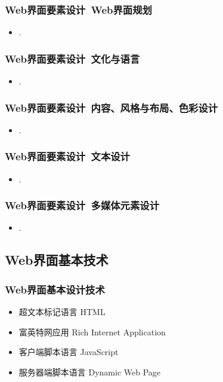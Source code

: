 \documentclass{beamer}
\newcommand{\fullPageImage}[2]{
	{
		\usebackgroundtemplate{\texttt{[image: \#1]}}
		\frame[plain]{#2}
	}
}
\begin{document}
\begin{frame}
	\frametitle{Web界面要素设计~{\small Web界面规划}}
	\beamertemplatetransparentcovereddynamicmedium
	\begin{itemize}[<+->]
		\item .
	\end{itemize}
\end{frame}

\begin{frame}
	\frametitle{Web界面要素设计~{\small 文化与语言}}
	\beamertemplatetransparentcovereddynamicmedium
	\begin{itemize}[<+->]
		\item .
	\end{itemize}
\end{frame}

\begin{frame}
	\frametitle{Web界面要素设计~{\small 内容、风格与布局、色彩设计}}
	\beamertemplatetransparentcovereddynamicmedium
	\begin{itemize}[<+->]
		\item .
	\end{itemize}
\end{frame}

\begin{frame}
	\frametitle{Web界面要素设计~{\small 文本设计}}
	\beamertemplatetransparentcovereddynamicmedium
	\begin{itemize}[<+->]
		\item .
	\end{itemize}
\end{frame}

\begin{frame}
	\frametitle{Web界面要素设计~{\small 多媒体元素设计}}
	\beamertemplatetransparentcovereddynamicmedium
	\begin{itemize}[<+->]
		\item .
	\end{itemize}
\end{frame}

\subsection{Web界面基本技术}
\fullPageImage{images/abbreviation-overload.png}{}

\begin{frame}
	\frametitle{Web界面基本设计技术}
	\beamertemplatetransparentcovereddynamicmedium
	\begin{itemize}[<+->]
		\item 超文本标记语言 HTML
		\item 富英特网应用 Rich Internet Application 
		\item 客户端脚本语言 JavaScript 
		\item 服务器端脚本语言 Dynamic Web Page
	\end{itemize}
\end{frame}
\end{document}

